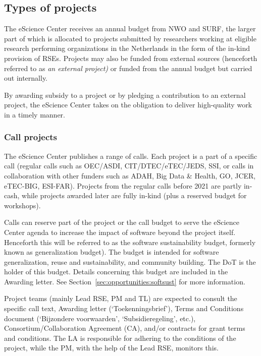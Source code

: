 \documentclass[11pt]{article}
\begin{document}
\subsection{Types of projects}
The eScience Center receives an annual budget from NWO and SURF, the larger part of which is allocated to projects
submitted by researchers working at eligible research performing organizations in the Netherlands in the form of the
in-kind provision of RSEs. Projects may also be funded from external sources (henceforth referred to as \textit{an
external project) }or funded from the annual budget but carried out internally.

By awarding subsidy to a project or by pledging a contribution to an external project, the eScience Center takes on the
obligation to deliver high-quality work in a timely manner.

\subsubsection{Call projects}

The eScience Center publishes a range of calls. Each project is a part of a specific call (regular calls such as
OEC/ASDI, CIT/DTEC/eTEC/JEDS, SSI, or calls in collaboration with other funders such as ADAH, Big Data \& Health, GO,
JCER, eTEC-BIG, ESI-FAR). Projects from the regular calls before 2021 are partly in-cash, while projects awarded later
are fully in-kind (plus a reserved budget for workshops).

Calls can reserve part of the project or the call budget to serve the eScience Center agenda to increase the impact of
software beyond the project itself. Henceforth this will be referred to as the software sustainability budget, formerly
known as generalization budget). The budget is intended for software generalization, reuse and sustainability, and
community building. The DoT is the holder of this budget. Details concerning this budget are included in the Awarding
letter. See Section~\ref{sec:opportunities:softsust} for more information.

Project teams (mainly Lead RSE, PM and TL) are expected to consult the specific call text, Awarding letter
(‘Toekenningsbrief’), Terms and Conditions document (‘Bijzondere voorwaarden’, ‘Subsidieregeling’, etc.), Consortium/Collaboration Agreement (CA), and/or
contracts for grant terms and conditions. The LA is responsible for adhering to the conditions of the project, while
the PM, with the help of the Lead RSE, monitors this.
\end{document}
